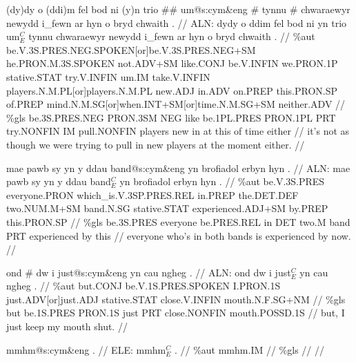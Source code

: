 \documentclass[a4paper,10pt]{article}
\begin{document}
\ex
\begingl[lingstyle=gergl]
\glchat (dy)dy o (ddi)m fel bod ni (y)n trio \#\# um@s:cym\&eng \# tynnu \# chwaraewyr newydd i\_fewn ar hyn o bryd chwaith . //
\glsurface ALN:  dydy o ddim fel bod ni yn trio um$^{C}_{E}$ tynnu chwaraewyr newydd i\_fewn ar hyn o bryd chwaith .  //
\glauto \%aut  be{\scriptsize .V.3S.PRES.NEG.SPOKEN[or]be.V.3S.PRES.NEG+SM} he{\scriptsize .PRON.M.3S.SPOKEN} not{\scriptsize .ADV+SM} like{\scriptsize .CONJ} be{\scriptsize .V.INFIN} we{\scriptsize .PRON.1P} stative{\scriptsize .STAT} try{\scriptsize .V.INFIN} um{\scriptsize .IM} take{\scriptsize .V.INFIN} players{\scriptsize .N.M.PL[or]players.N.M.PL} new{\scriptsize .ADJ} in{\scriptsize .ADV} on{\scriptsize .PREP} this{\scriptsize .PRON.SP} of{\scriptsize .PREP} mind{\scriptsize .N.M.SG[or]when.INT+SM[or]time.N.M.SG+SM} neither{\scriptsize .ADV}   //
\glmanual \%gls  be{\scriptsize .3S.PRES.NEG} PRON{\scriptsize .3SM} NEG like be{\scriptsize .1PL.PRES} PRON{\scriptsize .1PL} PRT try{\scriptsize .NONFIN} IM pull{\scriptsize .NONFIN} players new in at this of time either   //
\gleng it's not as though we were trying to pull in new players at the moment either. //
\endgl
\xe

\ex
\begingl[lingstyle=gergl]
\glchat mae pawb sy yn y ddau band@s:cym\&eng yn brofiadol erbyn hyn . //
\glsurface ALN:  mae pawb sy yn y ddau band$^{C}_{E}$ yn brofiadol erbyn hyn .  //
\glauto \%aut  be{\scriptsize .V.3S.PRES} everyone{\scriptsize .PRON} which\_is{\scriptsize .V.3SP.PRES.REL} in{\scriptsize .PREP} the{\scriptsize .DET.DEF} two{\scriptsize .NUM.M+SM} band{\scriptsize .N.SG} stative{\scriptsize .STAT} experienced{\scriptsize .ADJ+SM} by{\scriptsize .PREP} this{\scriptsize .PRON.SP}   //
\glmanual \%gls  be{\scriptsize .3S.PRES} everyone be{\scriptsize .PRES.REL} in DET two{\scriptsize .M} band PRT experienced by this   //
\gleng everyone who's in both bands is experienced by now. //
\endgl
\xe

\ex
\begingl[lingstyle=gergl]
\glchat ond \# dw i just@s:cym\&eng yn cau ngheg . //
\glsurface ALN:  ond dw i just$^{C}_{E}$ yn cau ngheg .  //
\glauto \%aut  but{\scriptsize .CONJ} be{\scriptsize .V.1S.PRES.SPOKEN} I{\scriptsize .PRON.1S} just{\scriptsize .ADV[or]just.ADJ} stative{\scriptsize .STAT} close{\scriptsize .V.INFIN} mouth{\scriptsize .N.F.SG+NM}   //
\glmanual \%gls  but be{\scriptsize .1S.PRES} PRON{\scriptsize .1S} just PRT close{\scriptsize .NONFIN} mouth{\scriptsize .POSSD.1S}   //
\gleng but, I just keep my mouth shut. //
\endgl
\xe

\ex
\begingl[lingstyle=gergl]
\glchat mmhm@s:cym\&eng . //
\glsurface ELE:  mmhm$^{C}_{E}$ .  //
\glauto \%aut  mmhm{\scriptsize .IM}   //
\glmanual \%gls     //
\gleng  //
\endgl
\xe
\end{document}
